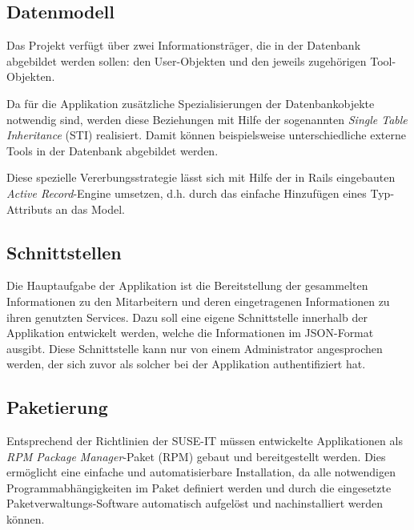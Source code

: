 \subsection{Datenmodell}
\label{sec:Datenmodell}
Das Projekt verfügt über zwei Informationsträger, die in der Datenbank abgebildet werden
sollen: den User-Objekten und den jeweils zugehörigen Tool-Objekten.


Da für die Applikation zusätzliche Spezialisierungen der Datenbankobjekte notwendig sind, werden
diese Beziehungen mit Hilfe der sogenannten \textit{Single Table Inheritance} (\acs{STI}) realisiert.
Damit können beispielsweise unterschiedliche externe Tools in der Datenbank abgebildet werden.


Diese spezielle Vererbungsstrategie lässt sich mit Hilfe der in Rails eingebauten
\textit{Active Record}-Engine umsetzen, d.h. durch das einfache Hinzufügen eines Typ-Attributs an das Model.

\subsection{Schnittstellen}
\label{sec:Schnittstellen}
Die Hauptaufgabe der Applikation ist die Bereitstellung der gesammelten Informationen zu den
Mitarbeitern und deren eingetragenen Informationen zu ihren genutzten Services. Dazu soll eine
eigene Schnittstelle innerhalb der Applikation entwickelt werden, welche die Informationen im
JSON-Format ausgibt. Diese Schnittstelle kann nur von einem Administrator angesprochen
werden, der sich zuvor als solcher bei der Applikation authentifiziert hat.


\subsection{Paketierung}
\label{sec:Paketierung}

Entsprechend der Richtlinien der SUSE-IT müssen entwickelte
Applikationen als \textit{RPM Package Manager}-Paket (\acs{RPM}) gebaut und bereitgestellt werden. Dies
ermöglicht eine einfache und automatisierbare Installation, da alle
notwendigen Programmabhängigkeiten im Paket definiert werden und durch
die eingesetzte Paketverwaltungs-Software automatisch aufgelöst und
nachinstalliert werden können.
